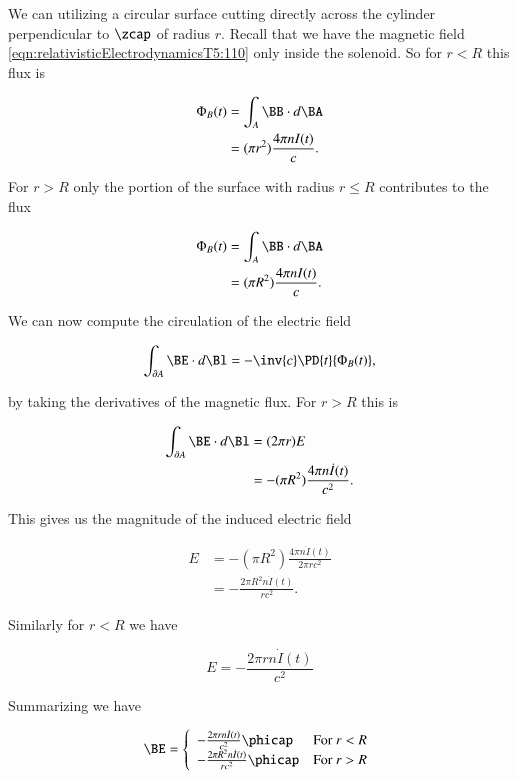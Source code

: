 We can utilizing a circular surface cutting directly across the cylinder perpendicular to $\zcap$ of radius $r$.  Recall that we have the magnetic field \ref{eqn:relativisticElectrodynamicsT5:110} only inside the solenoid.  So for $r < R$ this flux is

\begin{align*}
\Phi_B(t)
&= \int_A \BB \cdot d\BA \\
&= (\pi r^2) \frac{4 \pi n I(t)}{c}.
\end{align*}

For $r > R$ only the portion of the surface with radius $r \le R$ contributes to the flux

\begin{align*}
\Phi_B(t)
&= \int_A \BB \cdot d\BA \\
&= (\pi R^2) \frac{4 \pi n I(t)}{c}.
\end{align*}

We can now compute the circulation of the electric field

\begin{equation}\label{eqn:relativisticElectrodynamicsT5:292}
\int_{\partial A} \BE \cdot d\Bl = - \inv{c} \PD{t}{\Phi_B(t)},
\end{equation}

by taking the derivatives of the magnetic flux.  For $r > R$ this is

\begin{align*}
\int_{\partial A} \BE \cdot d\Bl
&= (2 \pi r) E \\
&=
-(\pi R^2) \frac{4 \pi n \dot{I}(t)}{c^2}.
\end{align*}

This gives us the magnitude of the induced electric field

\begin{align*}
E
&= -(\pi R^2) \frac{4 \pi n \dot{I}(t)}{2 \pi r c^2} \\
&= -\frac{2 \pi R^2 n \dot{I}(t)}{r c^2}.
\end{align*}

Similarly for $r < R$ we have

\begin{equation}\label{eqn:relativisticElectrodynamicsT5:293}
E = -\frac{2 \pi r n \dot{I}(t)}{c^2}
\end{equation}

Summarizing we have

\begin{equation}\label{eqn:relativisticElectrodynamicsT5:310}
\BE =
\left\{
\begin{array}{l l}
-\frac{2 \pi r n \dot{I}(t)}{c^2} \phicap 		& \mbox{For $r < R$} \\
-\frac{2 \pi R^2 n \dot{I}(t)}{r c^2} \phicap 		& \mbox{For $r > R$}
\end{array}
\right.
\end{equation}

